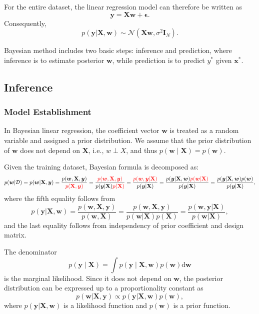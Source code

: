 \documentclass[../Bayesian_Inference.tex]{subfiles}
\begin{document}
For the entire dataset, the linear regression model can therefore be written as
\[
    \bm{y} = \mathbf{X}\bm{w} + \bm{\epsilon}.
\]
Consequently,
\[
    p(\bm{y} | \mathbf{X}, \bm{w}) \sim \mathcal{N}(\mathbf{X}\bm{w}, \sigma^2 \mathbf{I}_N).
\]

Bayesian method includes two basic steps: inference and prediction, where inference is to estimate posterior $\bm{w}$, while prediction is to predict ${y}^{*}$ given $\bm{x}^{*}$.

\subsection{Inference}


\subsubsection{Model Establishment}

In Bayesian linear regression, the coefficient vector $\bm{w}$ is treated as a random variable and assigned a prior distribution. We assume that the prior distribution of $\bm{w}$ does not depend on $\mathbf{X}$, i.e., $w\perp X$, and thus $p(\bm w\mid\mathbf X)=p(\bm w)$.

Given the training dataset, Bayesian formula is decomposed as: 
\[
    p(\bm{w} | \mathcal{D}) = p(\bm{w} | \mathbf{X}, \bm{y}) = \frac{p(\bm{w}, \mathbf{X}, \bm{y})}{\textcolor{red}{p(\mathbf{X}, \bm{y})}} = \frac{\textcolor{red}{p(\bm{w}, \mathbf{X}, \bm{y})}}{p(\bm{y}|\mathbf{X}) \textcolor{red}{p(\mathbf{X})} } = \frac{\textcolor{red}{p(\bm{w}, \bm{y} | \mathbf{X})}}{p(\bm{y}|\mathbf{X})} = \frac{p(\bm{y} | \mathbf{X}, \bm{w}) \textcolor{red}{p(\bm{w} | \mathbf{X})}}{p(\bm{y}|\mathbf{X})} = \frac{p(\bm{y} | \mathbf{X}, \bm{w}) p(\bm{w})}{p(\bm{y}|\mathbf{X})},
\]
where the fifth equality follows from
\[
    p(\bm{y} | \mathbf{X}, \bm{w}) = \frac{p(\bm{w}, \mathbf{X}, \bm{y})}{p(\bm{w}, \mathbf{X})} = \frac{p(\bm{w}, \mathbf{X}, \bm{y})}{ p(\bm{w} | \mathbf{X}) p(\mathbf{X})} = \frac{p(\bm{w}, \bm{y} | \mathbf{X})}{p(\bm{w} | \mathbf{X})},
\]
and the last equality follows from independency of prior coefficient and design matrix. 

The denominator 
\[
    p(\bm{y}\mid\mathbf{X}) = \int p(\bm{y}\mid\mathbf{X},\bm{w}) p(\bm{w})\mathrm{d}\bm{w}
\]  
is the marginal likelihood. Since it does not depend on $\bm{w}$, the posterior distribution can be expressed up to a proportionality constant as 
\[
    p(\bm{w} | \mathbf{X}, \bm{y}) \propto p(\bm{y} | \mathbf{X}, \bm{w}) p(\bm{w}),
\]
where $p(\bm{y} | \mathbf{X}, \bm{w})$ is a likelihood function and $p(\bm{w})$ is a prior function.
\end{document}

